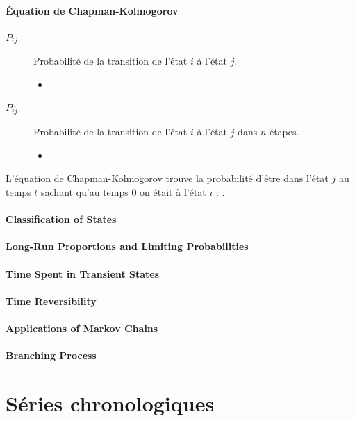 \documentclass[10pt, french]{article}
\begin{document}
\begin{multicols*}{2}
\subsection{Équation de Chapman-Kolmogorov}
\begin{distributions}[Notation]
\begin{description}
	\item[$P_{ij}$]	Probabilité de la transition de l'état $i$ à l'état $j$.
		\begin{itemize}
		\item	{}
		\end{itemize}
	\item[$P_{ij}^{n}$]	Probabilité de la transition de l'état $i$ à l'état $j$ dans $n$ étapes.
		\begin{itemize}
		\item	{}
		\end{itemize}
\end{description}
\end{distributions}

L'équation de Chapman-Kolmogorov trouve la probabilité d'être dans l'état $j$ au temps $t$ sachant qu'au temps $0$ on était à l'état $i$ : .

\subsection{Classification of States}


\subsection{Long-Run Proportions and Limiting Probabilities}


\subsection{Time Spent in Transient States}


\subsection{Time Reversibility}


\subsection{Applications of Markov Chains}


\subsection{Branching Process}





\pagebreak
\part{Séries chronologiques}
\label{chapt:seriesChrono}


\end{multicols*}
\end{document}
